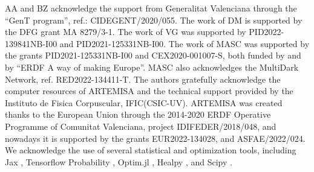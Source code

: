 \documentclass[12pt, a4paper]{article}
\newcommand{\Fermi}{{\textit{Fermi}}}
\newcommand{\ben}{\begin{enumerate}}
\newcommand{\een}{\end{enumerate}}
\begin{document}

\acknowledgments
%
AA and BZ acknowledge the support from Generalitat Valenciana through the “GenT program”, ref.: CIDEGENT/2020/055.
The work of DM is supported by the DFG grant MA 8279/3-1. 
The work of VG was supported by PID2022-139841NB-I00 and PID2021-125331NB-I00. 
The work of MASC was supported by the grants PID2021-125331NB-I00 and CEX2020-001007-S, both funded by  and by ``ERDF A way of making Europe''. MASC also acknowledges the MultiDark Network, ref. RED2022-134411-T. 
The authors gratefully acknowledge the computer resources  of ARTEMISA and the technical support provided by the Instituto de Fisica Corpuscular, IFIC(CSIC-UV). ARTEMISA was created thanks to the European Union through the 2014-2020 ERDF Operative Programme of Comunitat Valenciana, project IDIFEDER/2018/048, and nowadays it is supported by the grants
EUR2022-134028, and ASFAE/2022/024. 
We acknowledge the use of several statistical and optimization tools, including Jax \cite{jax}, Tensorflow Probability \cite{tensorflow2015-whitepaper}, Optim.jl \cite{mogensen2018optim}, Healpy \cite{healpy}, and Scipy \cite{scipy}.
\end{document}
